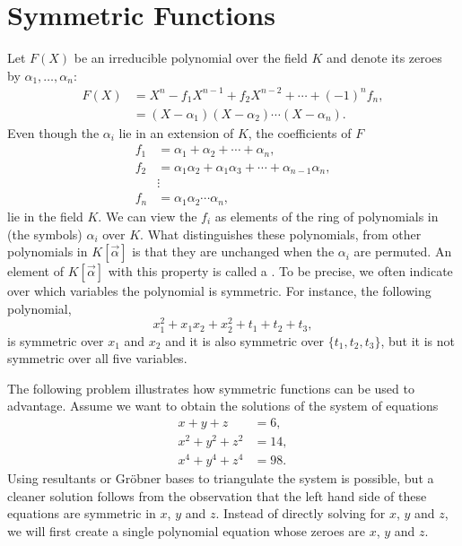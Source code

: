 \section{Symmetric Functions}
\label{Symmetric:Sec}

Let $F(X)$ be an irreducible polynomial over the field $K$ and
denote its zeroes by $\alpha_1, \ldots, \alpha_n$:
\[
\begin{aligned}
  F(X) &= X^n - f_1 X^{n-1} + f_2 X^{n-2} + \cdots +(-1)^n  f_n,\\
       &= (X - \alpha_1) (X - \alpha_2) \cdots (X - \alpha_n).
\end{aligned}
\]
Even though the $\alpha_i$ lie in an extension of $K$, the
coefficients of $F$
\[
\begin{aligned}
f_1 &= \alpha_1 + \alpha_2 + \cdots + \alpha_n, \\
f_2 &= \alpha_1 \alpha_2 + \alpha_1 \alpha_3 + \cdots 
     + \alpha_{n-1} \alpha_n, \\
  & \vdots \\
f_n &= \alpha_1 \alpha_2 \cdots \alpha_n,
\end{aligned}
\]
lie in the field $K$.  We can view the $f_i$ as elements of the ring
of polynomials in (the symbols) $\alpha_i$ over $K$.  What
distinguishes these polynomials, from other polynomials in
$K[\vec{\alpha}]$ is that they are unchanged when the $\alpha_i$ are
permuted.  An element of $K[\vec{\alpha}]$ with this property is
called a .  To be precise, we often indicate
over which variables the polynomial is symmetric.  For instance, the
following polynomial,
\[
x_1^2 + x_1 x_2 + x_2^2 + t_1 + t_2 + t_3,
\]
is symmetric over $ x_1$ and $x_2$ and it is also symmetric over
$\{t_1, t_2, t_3\}$, but it is not symmetric over all five variables.

The following problem illustrates how symmetric functions can be used
to advantage.  Assume we want to obtain the solutions of the system of
equations
\begin{equation}\label{TripleSymm:Eq}
\begin{aligned}
x   + y   + z   &= 6, \\
x^2 + y^2 + z^2 &= 14,\\
x^4 + y^4 + z^4 &= 98.
\end{aligned}
\end{equation}
Using resultants or Gr\"obner bases to triangulate the system is
possible, but a cleaner solution follows from the observation that the
left hand side of these equations are symmetric in $x$, $y$ and $z$.
Instead of directly solving for $x$, $y$ and $z$, we will first create
a single polynomial equation  whose zeroes are $x$, $y$ and $z$.

